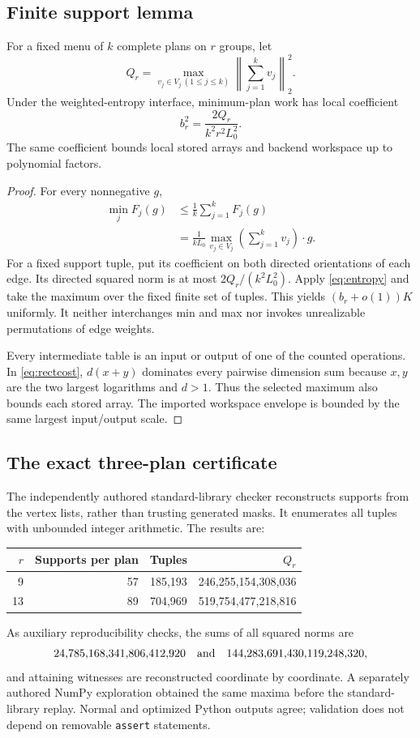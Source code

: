 \documentclass[11pt,letterpaper]{article}
\theoremstyle{remark}\newtheorem{remark}[theorem]{Remark}
\begin{document}
\subsection{Finite support lemma}
\begin{lemma}\label{lem:support}
For a fixed menu of $k$ complete plans on $r$ groups, let
\[
 Q_r=\max_{v_j\in V_j\ (1\le j\le k)}
       \left\|\sum_{j=1}^kv_j\right\|_2^2.
\]
Under the weighted-entropy interface, minimum-plan work has local coefficient
\[
 b_r^2=\frac{2Q_r}{k^2r^2L_0^2}.
\]
The same coefficient bounds local stored arrays and backend workspace up to polynomial factors.
\end{lemma}
\begin{proof}
For every nonnegative $g$,
\begin{align*}
 \min_jF_j(g)&\le\frac1k\sum_{j=1}^kF_j(g)\\
 &=\frac1{kL_0}\max_{v_j\in V_j}
          \left(\sum_{j=1}^kv_j\right)\cdot g.
\end{align*}
For a fixed support tuple, put its coefficient on both directed orientations of each edge. Its directed squared norm is at most $2Q_r/(k^2L_0^2)$. Apply \eqref{eq:entropy} and take the maximum over the fixed finite set of tuples. This yields $(b_r+o(1))K$ uniformly. It neither interchanges min and max nor invokes unrealizable permutations of edge weights.

Every intermediate table is an input or output of one of the counted operations. In \eqref{eq:rectcost}, $d(x+y)$ dominates every pairwise dimension sum because $x,y$ are the two largest logarithms and $d>1$. Thus the selected maximum also bounds each stored array. The imported workspace envelope is bounded by the same largest input/output scale.
\end{proof}

\subsection{The exact three-plan certificate}
The independently authored standard-library checker reconstructs supports from the vertex lists, rather than trusting generated masks. It enumerates all tuples with unbounded integer arithmetic. The results are:
\begin{center}\small
\begin{tabular}{@{}rrrr@{}}\toprule
$r$ & Supports per plan & Tuples & $Q_r$\\\midrule
9&57&185,193&246,255,154,308,036\\
13&89&704,969&519,754,477,218,816\\\bottomrule
\end{tabular}
\end{center}
As auxiliary reproducibility checks, the sums of all squared norms are
\[
 24{,}785{,}168{,}341{,}806{,}412{,}920\quad\hbox{and}\quad
 144{,}283{,}691{,}430{,}119{,}248{,}320,
\]
and attaining witnesses are reconstructed coordinate by coordinate. A separately authored NumPy exploration obtained the same maxima before the standard-library replay. Normal and optimized Python outputs agree; validation does not depend on removable \texttt{assert} statements.
\end{document}
